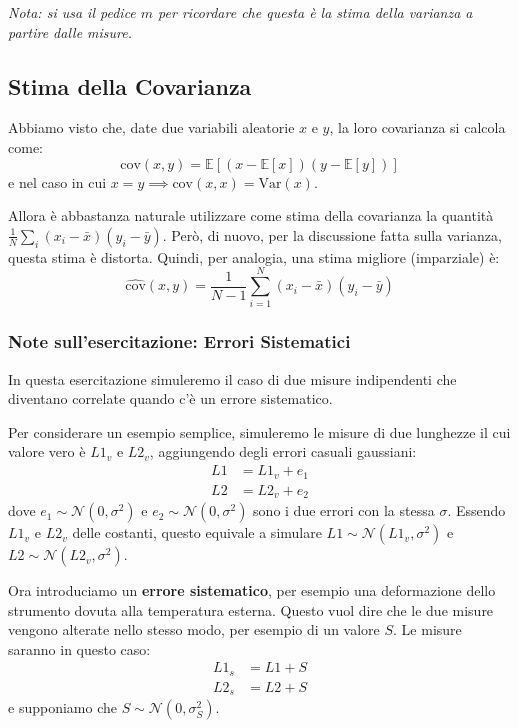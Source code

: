 \documentclass[openany,a4paper,12pt]{book}
\theoremstyle{remark}
\begin{document}
\emph{Nota: si usa il pedice $m$ per ricordare che questa è la stima della varianza a partire dalle misure.}

\subsection*{Stima della Covarianza}
Abbiamo visto che, date due variabili aleatorie $x$ e $y$, la loro covarianza si calcola come:
\begin{equation}
\text{cov}(x,y) = \mathbb{E}\left[ (x - \mathbb{E}[x])(y - \mathbb{E}[y]) \right]
\end{equation}
e nel caso in cui $x=y \implies \text{cov}(x,x) = \text{Var}(x)$.

Allora è abbastanza naturale utilizzare come stima della covarianza la quantità $\frac{1}{N} \sum_{i} (x_i - \bar{x})(y_i - \bar{y})$. 
Però, di nuovo, per la discussione fatta sulla varianza, questa stima è distorta. Quindi, per analogia, una stima migliore (imparziale) è:
\begin{equation}
\hat{\text{cov}}(x,y) = \frac{1}{N-1} \sum_{i=1}^N (x_i - \bar{x})(y_i - \bar{y})
\end{equation}


\subsubsection*{Note sull'esercitazione: Errori Sistematici}
In questa esercitazione simuleremo il caso di due misure indipendenti che diventano correlate quando c'è un errore sistematico.

Per considerare un esempio semplice, simuleremo le misure di due lunghezze il cui valore vero è $L1_v$ e $L2_v$, aggiungendo degli errori casuali gaussiani:
\begin{align*}
L1 &= L1_v + e_1 \\
L2 &= L2_v + e_2
\end{align*}
dove $e_1 \sim \mathcal{N}(0, \sigma^2)$ e $e_2 \sim \mathcal{N}(0, \sigma^2)$ sono i due errori con la stessa $\sigma$. 
Essendo $L1_v$ e $L2_v$ delle costanti, questo equivale a simulare $L1 \sim \mathcal{N}(L1_v, \sigma^2)$ e $L2 \sim \mathcal{N}(L2_v, \sigma^2)$.

Ora introduciamo un \textbf{errore sistematico}, per esempio una deformazione dello strumento dovuta alla temperatura esterna. Questo vuol dire che le due misure vengono alterate nello stesso modo, per esempio di un valore $S$. Le misure saranno in questo caso:
\begin{align*}
L1_s &= L1 + S \\
L2_s &= L2 + S
\end{align*}
e supponiamo che $S \sim \mathcal{N}(0, \sigma_S^2)$.
\end{document}

